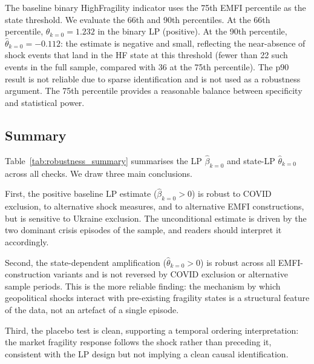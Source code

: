 \documentclass[11pt]{article}
\begin{document}
The baseline binary HighFragility indicator uses the 75th EMFI percentile as the
state threshold. We evaluate the 66th and 90th percentiles. At the 66th percentile,
$\hat\theta_{k=0} = 1.232$ in the binary LP (positive). At the 90th percentile,
$\hat\theta_{k=0} = -0.112$: the estimate is negative and small, reflecting the
near-absence of shock events that land in the HF state at this threshold (fewer than
22 such events in the full sample, compared with 36 at the 75th percentile). The
p90 result is not reliable due to sparse identification and is not used as a
robustness argument. The 75th percentile provides a reasonable balance between
specificity and statistical power.

\subsection{Summary}
\label{sec:rob_summary}

Table~\ref{tab:robustness_summary} summarises the LP $\hat\beta_{k=0}$ and
state-LP $\hat\theta_{k=0}$ across all checks. We draw three main conclusions.

First, the positive baseline LP estimate ($\hat\beta_{k=0} > 0$) is robust to
COVID exclusion, to alternative shock measures, and to alternative EMFI constructions,
but is sensitive to Ukraine exclusion. The unconditional estimate is driven by the
two dominant crisis episodes of the sample, and readers should interpret it accordingly.

Second, the state-dependent amplification ($\hat\theta_{k=0} > 0$) is robust across
all EMFI-construction variants and is not reversed by COVID exclusion or alternative
sample periods. This is the more reliable finding: the mechanism by which geopolitical
shocks interact with pre-existing fragility states is a structural feature of the data,
not an artefact of a single episode.

Third, the placebo test is clean, supporting a temporal ordering
interpretation: the market fragility response follows the shock rather
than preceding it, consistent with the LP design but not implying a
clean causal identification.
\end{document}
